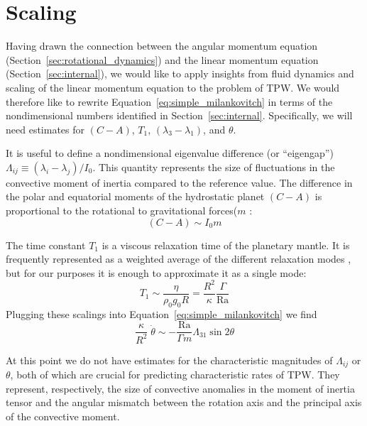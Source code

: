 \documentclass[extra,mreferee]{gji}
\begin{document}
\section{Scaling}
\label{sec:scaling}

Having drawn the connection between the angular momentum equation (Section~\ref{sec:rotational_dynamics}) and the linear momentum 
equation (Section~\ref{sec:internal}), we would like to apply insights from fluid dynamics and scaling of the 
linear momentum equation to the problem of TPW. We would therefore like to rewrite Equation~\eqref{eq:simple_milankovitch}
in terms of the nondimensional numbers identified in Section~\ref{sec:internal}.
Specifically, we will need estimates for $(C-A)$, $T_1$, $(\lambda_3-\lambda_1)$, and $\theta$. 

It is useful to define a nondimensional eigenvalue difference (or ``eigengap'') $\Lambda_{ij} \equiv (\lambda_i - \lambda_j)/I_0$.  
This quantity represents the size of fluctuations in the convective moment of inertia compared to the reference value.
The difference in the polar and equatorial moments of the hydrostatic planet $(C-A)$ is proportional to the rotational to gravitational forces($m$ \citep{munk1960rotation}:
\begin{equation}
(C-A) \sim I_0 m
\end{equation}

The time constant $T_1$ is a viscous relaxation time of the planetary mantle. It is frequently represented as a weighted average of the different relaxation modes \citep[e.g.][]{ricard1993polar, greff2004upwelling}, but for our purposes it is enough to approximate it as a single mode:
\begin{equation}
T_1 \sim \frac{ \eta }{ \rho_0 g_0 R} = \frac{R^2}{\kappa} \frac{\Gamma}{\mathrm{Ra} }
\end{equation}
Plugging these scalings into Equation~\eqref{eq:simple_milankovitch} we find
\begin{equation}
\frac{\kappa}{R^2} \; \dot{\theta} \sim - \frac{\mathrm{Ra}}{\Gamma m} \Lambda_{31} \sin{2 \theta}
\label{eq:scaled_rotation}
\end{equation}

At this point we do not have estimates for the characteristic magnitudes of $\Lambda_{ij}$ or $\theta$, both of which are crucial for predicting characteristic rates of TPW.
They represent, respectively, the size of convective anomalies in the moment of inertia tensor and the angular mismatch between the rotation axis and the principal axis of the convective moment.
\end{document}
